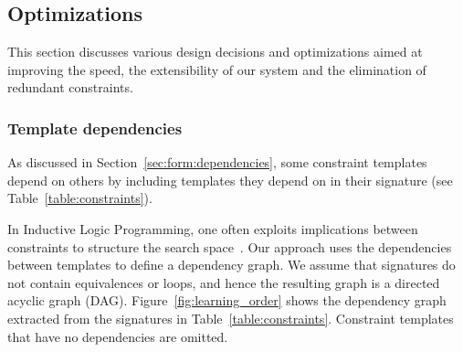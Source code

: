 






\subsection{Optimizations} \label{sec:opts}
This section discusses various design decisions and optimizations aimed at improving the speed, the extensibility of our system and the elimination of redundant constraints.

\subsubsection{Template dependencies}
As discussed in Section~\ref{sec:form:dependencies}, some constraint templates depend on others by including templates they depend on in their signature (see Table~\ref{table:constraints}).

In Inductive Logic Programming, one often exploits implications between constraints to structure the search space~\cite{luc_book}.
Our approach uses the dependencies between templates to define a dependency graph.
We assume that signatures do not contain equivalences or loops, and hence the resulting graph is a directed acyclic graph (DAG).
Figure~\ref{fig:learning_order} shows the dependency graph extracted from the signatures in Table~\ref{table:constraints}. 
Constraint templates that have no dependencies are omitted.

